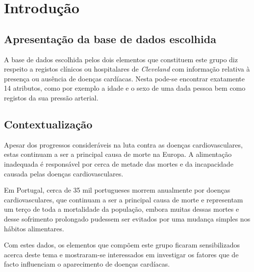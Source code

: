 \documentclass[a4paper]{report}
\begin{document}
\chapter{Introdução} \label{intro}
\large{
    \section{Apresentação da base de dados escolhida}
	A base de dados escolhida pelos dois elementos que constituem este grupo diz respeito a registos clínicos ou hospitalares de \textit{Cleveland} com informação relativa à presença ou 
	ausência de doenças cardíacas. Nesta pode-se encontrar exatamente 14 atributos, como por exemplo a idade e o sexo de uma dada pessoa bem como registos da sua pressão arterial. 
	
	\section{Contextualização}
	Apesar dos progressos consideráveis na luta contra as doenças cardiovasculares, estas continuam a ser a principal causa de morte na Europa. A alimentação inadequada é responsável por 
	cerca de metade das mortes e da incapacidade causada pelas doenças cardiovasculares.
	
	Em Portugal, cerca de 35 mil portugueses morrem anualmente por doenças cardiovasculares, que continuam a ser a principal causa de morte e representam um terço de toda a mortalidade da 
	população, embora muitas dessas mortes e desse sofrimento prolongado pudessem ser evitados por uma mudança simples nos hábitos alimentares.
	
	Com estes dados, os elementos que compõem este grupo ficaram sensibilizados acerca deste tema e mostraram-se interessados em investigar os fatores que de facto influenciam o aparecimento 
	de doenças cardíacas.

}
\end{document}
